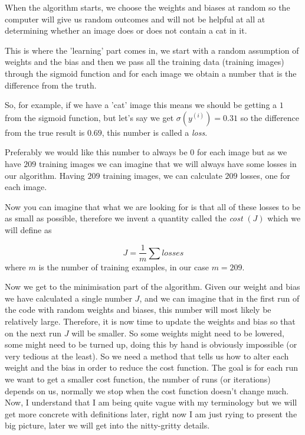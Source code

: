 When the algorithm starts, we choose the weights and biases at random
so the computer will give us random outcomes and will not be helpful at
all at determining whether an image does or does not contain a cat in it.

This is where the 'learning' part comes in, we start with a random
assumption of weights and the bias and then we pass all the training data
(training images)
through the sigmoid function and for each image we obtain a number
that is the difference from the truth.

So, for example, if we have a 'cat' image this means we should
be getting a $1$ from the sigmoid function, but let's say we get
$\sigma(y^{(i)})=0.31$ so the difference from the true result is $0.69$,
this number is called a \textit{loss}. 

Preferably we would like this number to always be $0$ for each image but
as we have $209$ training images we can imagine that we will
always have some losses in our algorithm. Having $209$ training
images, we can calculate $209$ losses, 
one for each image.

Now you can imagine that what we are looking for is that all of
these losses to be as small as possible, therefore we invent a 
quantity called the \textit{cost} $(J)$ which we will define as

\begin{equation}
    J = \frac{1}{m} \sum losses
\end{equation}
where $m$ is the number of training examples, in our case $m=209$.

Now we get to the minimisation part of the algorithm. Given our
weight and bias we have calculated a single number $J$, and we can
imagine that in the first run of the code with random weights and
biases, this number will most likely be relatively large.
Therefore, it is 
now time to update the weights and bias so that on the
next run $J$ will be smaller. So some weights might need to be
lowered, some might need to be turned up, doing this by hand
is obviously impossible (or very tedious at the least). 
So we need a method that tells us how to alter each weight and the bias
in order to reduce the cost function. The goal is for each run
we want to get a smaller cost function, the number of runs (or iterations)
depends on us, normally we stop when the cost function doesn't change
much. Now, I understand that I am being quite vague with my terminology
but we will get more concrete with definitions later, right now I am
just rying to present the big picture, later we will get into
the nitty-gritty details.

